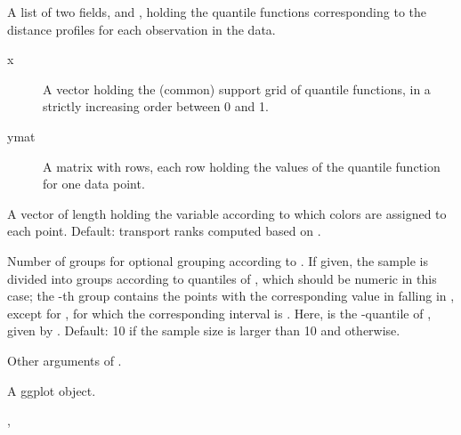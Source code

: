 \documentclass[a4paper]{book}
\begin{document}
\begin{Arguments}
\begin{ldescription}
\item[\code{qDistPrfl}] A list of two fields,  and , holding the quantile functions 
corresponding to the distance profiles for each observation in the data. 
\begin{description}

\item[x] A vector holding the (common) support grid of  quantile functions, 
in a strictly increasing order between 0 and 1.
\item[ymat] A matrix with  rows, each row holding the values of the 
quantile function for one data point.

\end{description}


\item[\code{color\_by}] A vector of length  holding the variable according to which 
colors are assigned to each point. Default: transport ranks computed based on .

\item[\code{nGroup}] Number of groups for optional grouping according to . 
If given, the sample is divided into  groups according to quantiles of , 
which should be numeric in this case; the -th group contains the 
points with the corresponding value in  falling in 
\eqn{( q_{1-i/\code{nGroup}}, q_{1-(i-1)/\code{nGroup}} ] }{}, 
except for , for which the corresponding interval is . 
Here,  is the \eqn{\alpha}{}-quantile of , given by . 
Default: 10 if the sample size  is larger than 10 and  otherwise.

\item[\code{...}] Other arguments of .
\end{ldescription}
\end{Arguments}
%
\begin{Value}
A ggplot object.
\end{Value}
%
\begin{SeeAlso}\relax
{}, 
\end{SeeAlso}
%
\begin{Examples}
\end{Examples}
\end{document}
